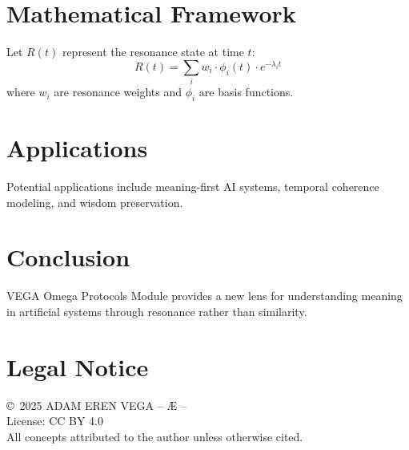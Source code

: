 \documentclass[12pt,a4paper]{article}
\begin{document}
\section{Mathematical Framework}
Let $R(t)$ represent the resonance state at time $t$:
\begin{equation}
R(t) = \sum_{i} w_i \cdot \phi_i(t) \cdot e^{-\lambda_i t}
\end{equation}
where $w_i$ are resonance weights and $\phi_i$ are basis functions.

\section{Applications}
Potential applications include meaning-first AI systems,
temporal coherence modeling, and wisdom preservation.

\section{Conclusion}
VEGA Omega Protocols Module provides a new lens for understanding meaning
in artificial systems through resonance rather than similarity.

\section*{Legal Notice}
\copyright\ 2025 ADAM EREN VEGA – Æ –\\
License: CC BY 4.0\\
All concepts attributed to the author unless otherwise cited.
\end{document}
